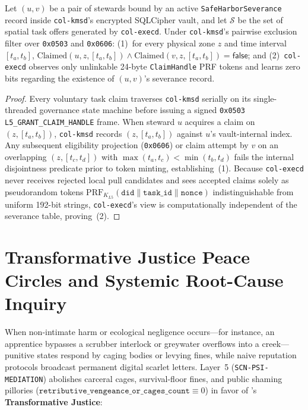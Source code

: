 \begin{theorem}
\label{thm:ch7-zk-severance}
Let $(u, v)$ be a pair of stewards bound by an active \texttt{SafeHarborSeverance} record inside
\texttt{col-kmsd}'s encrypted SQLCipher vault, and let $\mathcal{S}$ be the set of spatial task
offers generated by \texttt{col-execd}. Under \texttt{col-kmsd}'s pairwise exclusion filter over
\texttt{0x0503} and \texttt{0x0606}: (1)~for every physical zone $z$ and time interval $[t_a, t_b]$,
$\mathrm{Claimed}(u, z, [t_a, t_b]) \land \mathrm{Claimed}(v, z, [t_a, t_b]) = \mathsf{false}$; and
(2)~\texttt{col-execd} observes only unlinkable 24-byte \texttt{ClaimHandle} PRF tokens and learns
zero bits regarding the existence of $(u, v)$'s severance record.
\end{theorem}
\begin{proof}
Every voluntary task claim traverses \texttt{col-kmsd} serially on its single-threaded governance
state machine before issuing a signed \texttt{0x0503 L5\_GRANT\_CLAIM\_HANDLE} frame. When steward
$u$ acquires a claim on $(z, [t_a, t_b])$, \texttt{col-kmsd} records $(z, [t_a, t_b])$ against $u$'s
vault-internal index. Any subsequent eligibility projection (\texttt{0x0606}) or claim attempt by
$v$ on an overlapping $(z, [t_c, t_d])$ with $\max(t_a, t_c) < \min(t_b, t_d)$ fails the internal
disjointness predicate prior to token minting, establishing~(1). Because \texttt{col-execd} never
receives rejected local pull candidates and sees accepted claims solely as pseudorandom tokens
$\mathrm{PRF}_{K_{L5}}(\mathtt{did} \parallel \mathtt{task\_id} \parallel \mathtt{nonce})$
indistinguishable from uniform 192-bit strings, \texttt{col-execd}'s view is computationally
independent of the severance table, proving~(2).
\end{proof}

\section{Transformative Justice Peace Circles and Systemic Root-Cause Inquiry}
\label{sec:ch7-transformative-justice}

When non-intimate harm or ecological negligence occurs---for instance, an apprentice bypasses a
scrubber interlock or greywater overflows into a creek---punitive states respond by caging bodies
or levying fines, while naive reputation protocols broadcast permanent digital scarlet letters.
Layer~5 (\texttt{SCN-PSI-MEDIATION}) abolishes carceral cages, survival-floor fines, and public
shaming pillories ($\mathtt{retributive\_vengeance\_or\_cages\_count} \equiv 0$) in favor of
\textcite{zehr1990}'s \textbf{Transformative Justice}:

